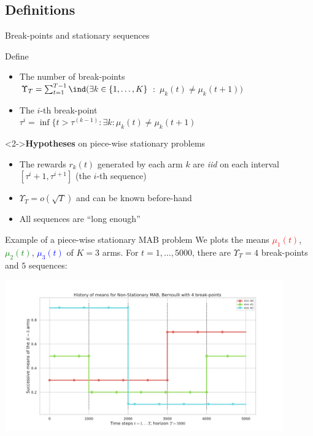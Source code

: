 \documentclass[11pt,english,ignorenonframetext,]{beamer}
\providecommand{\tightlist}{%
  \setlength{\itemsep}{0pt}\setlength{\parskip}{0pt}}
\begin{document}
\subsection{\hfill{}Definitions\hfill{}}

\begin{frame}{Break-points and stationary sequences}

  Define

  \begin{itemize}
    \item
    The number of break-points\\
    $\Upsilon_T = \sum_{t=1}^{T-1} \ind(\exists k\in \{1,\dots,K\}$ $:$ $\mu_k(t) \neq \mu_k(t+1) )$

    \item
    The $i$-th break-point\\
    $\tau^{i} = \inf\{t > \tau^{(k-1)} : \exists k : \mu_k(t) \neq \mu_k(t+1)$
  \end{itemize}

  \begin{block}<2->{\textbf{Hypotheses} on piece-wise stationary problems}
    \begin{itemize}\tightlist
      \item The rewards $r_k(t)$ generated by each arm $k$ are \emph{iid} on each interval $[\tau^{i} + 1, \tau^{i+1}]$ (the $i$-th sequence)
      \item $\Upsilon_T = o(\sqrt{T})$ and \alert{can be known before-hand}
      \item All sequences are ``long enough''
  \end{itemize}
\end{block}
\end{frame}


\begin{frame}[plain]{Example of a piece-wise stationary MAB problem}
  We plots the means \textcolor{red}{$\mu_1(t)$}, \textcolor{green}{$\mu_2(t)$}, \textcolor{blue}{$\mu_3(t)$}
  of $K=3$ arms.
  For $t=1,\dots,5000$,
  there are $\Upsilon_T=4$ break-points and $5$ sequences:
  \begin{center}
    \includegraphics[width=0.90\textwidth]{figures/Problem_1.pdf}
  \end{center}
\end{frame}
\end{document}
